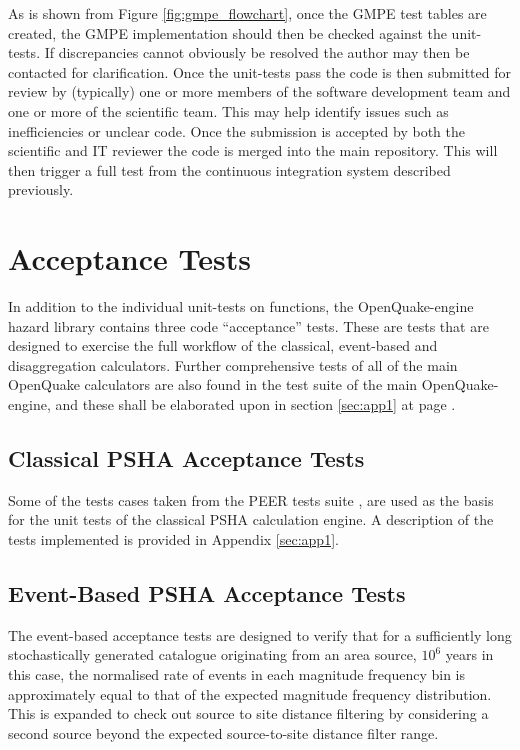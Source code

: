 As is shown from Figure \ref{fig:gmpe_flowchart}, once the GMPE test tables are
created, the GMPE implementation should then be checked against the unit-tests.
If discrepancies cannot obviously be resolved the author may then be contacted
for clarification. Once the unit-tests pass the code is then submitted for
review by (typically) one or more members of the software development team and
one or more of the scientific team. This may help identify issues such as
inefficiencies or unclear code. Once the submission is accepted by both the
scientific and IT reviewer the code is merged into the main repository.  This
will then trigger a full test from the continuous integration system described
previously.
%
\section{Acceptance Tests}
In addition to the individual unit-tests on functions, the OpenQuake-engine
hazard library contains three code ``acceptance'' tests. These are tests that
are designed to exercise the full workflow of the classical, event-based and
disaggregation calculators. Further comprehensive tests of all of the main
OpenQuake calculators are also found in the test suite of the main
OpenQuake-engine, and these shall be elaborated upon in section \ref{sec:app1}
at page \pageref{sec:app1}.
%
\subsection{Classical PSHA Acceptance Tests}
Some of the tests cases taken from the PEER tests suite \citep{thomas2010}, are
used as the basis for the unit tests of the classical PSHA calculation engine. A
description of the tests implemented is provided in Appendix \ref{sec:app1}.
%
\subsection{Event-Based PSHA Acceptance Tests}
The event-based acceptance tests are designed to verify that for a sufficiently
long stochastically generated catalogue originating from an area source, $10^6$
years in this case, the normalised rate of events in each magnitude frequency
bin is approximately equal to that of the expected magnitude frequency
distribution. 
%
This is expanded to check out source to site distance filtering by considering a
second source beyond the expected source-to-site distance filter range. 
%
